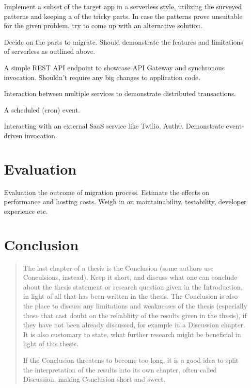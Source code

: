 \documentclass[utf8,english]{gradu3}
\begin{document}
Implement a subset of the target app in a serverless style, utilizing the surveyed patterns and keeping a of the tricky parts. In case the patterns prove unsuitable for the given problem, try to come up with an alternative solution.

Decide on the parts to migrate. Should demonstrate the features and limitations of serverless as outlined above.

A simple REST API endpoint to showcase API Gateway and synchronous invocation. Shouldn't require any big changes to application code.

Interaction between multiple services to demonstrate distributed transactions.

A scheduled (cron) event.

Interacting with an external SaaS service like Twilio, Auth0. Demonstrate event-driven invocation.

\chapter{Evaluation}

Evaluation the outcome of migration process. Estimate the effects on performance and hosting costs. Weigh in on maintainability, testability, developer experience etc.

\chapter{Conclusion}

\begin{quote}
The last chapter of a thesis is the Conclusion (some authors use
Conculsions, instead).  Keep it short, and discuss what one can
conclude about the thesis statement or research question given in the
Introduction, in light of all that has been written in the thesis.
The Conclusion is also the place to discuss any limitations and
weaknesses of the thesis (especially those that cast doubt on the
reliabliity of the results given in the thesis), if they have not been
already discussed, for example in a Discussion chapter.  It is also
customary to state, what further research might be beneficial in light
of this thesis.

If the Conclusion threatens to become too long, it is a good idea to
split the interpretation of the results into its own chapter, often
called Discussion, making Conclusion short and sweet.
\end{quote}

\printbibliography
\end{document}
